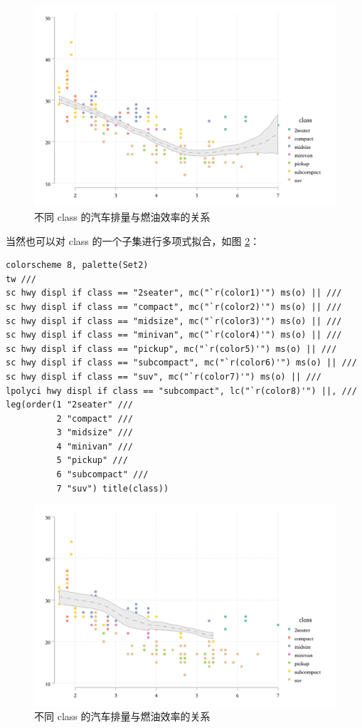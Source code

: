 \begin{figure}[htbp]
  \centering
  \includegraphics[width=\textwidth]{assets/lpolycihwydispl.png}
  \caption{不同 class 的汽车排量与燃油效率的关系}\label{fig:lpolycihwydispl}
\end{figure}

当然也可以对 class 的一个子集进行多项式拟合，如图 \ref{fig:lpolycihwydispl2}：

\begin{lstlisting}
colorscheme 8, palette(Set2)
tw ///
sc hwy displ if class == "2seater", mc("`r(color1)'") ms(o) || ///
sc hwy displ if class == "compact", mc("`r(color2)'") ms(o) || ///
sc hwy displ if class == "midsize", mc("`r(color3)'") ms(o) || ///
sc hwy displ if class == "minivan", mc("`r(color4)'") ms(o) || ///
sc hwy displ if class == "pickup", mc("`r(color5)'") ms(o) || ///
sc hwy displ if class == "subcompact", mc("`r(color6)'") ms(o) || ///
sc hwy displ if class == "suv", mc("`r(color7)'") ms(o) || ///
lpolyci hwy displ if class == "subcompact", lc("`r(color8)'") ||, ///
leg(order(1 "2seater" ///
          2 "compact" ///
          3 "midsize" ///
          4 "minivan" ///
          5 "pickup" ///
          6 "subcompact" ///
          7 "suv") title(class))
\end{lstlisting}

\begin{figure}[htbp]
  \centering
  \includegraphics[width=\textwidth]{assets/lpolycihwydispl2.png}
  \caption{不同 class 的汽车排量与燃油效率的关系}
  \label{fig:lpolycihwydispl2}
\end{figure}

